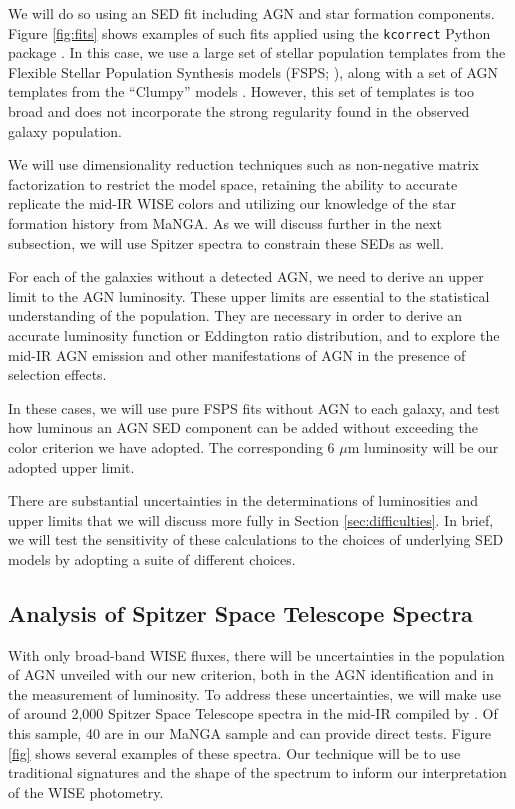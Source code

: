 \documentclass[12pt, preprint]{hacked-aastex}
\begin{document}
We will do so using an SED fit including AGN and star formation components. 
Figure \ref{fig:fits} shows examples of such fits applied using the
{\tt kcorrect} Python package \cite{blanton07a}. In this case, we use  
a large set of stellar population templates from the Flexible Stellar
Population Synthesis models (FSPS; \cite{conroy09a}), along with a set of AGN
templates from the ``Clumpy'' models \cite{nenkova08a}. However, this set
of templates is too broad and does not incorporate the strong regularity 
found in the observed galaxy population. 

We will use dimensionality reduction techniques such as non-negative 
matrix factorization to restrict the model space, retaining the ability
to accurate replicate the mid-IR WISE colors and utilizing our knowledge
of the star formation history from MaNGA.
As we will discuss further in the next subsection, we will use Spitzer spectra 
to constrain these SEDs as well.

For each of the galaxies without a detected AGN, we need to derive an
upper limit to the AGN luminosity. These upper limits are essential to 
the statistical understanding of the population. They are necessary in 
order to derive an accurate luminosity function or Eddington ratio
distribution, and to explore the mid-IR AGN emission and other manifestations 
of AGN in the presence of selection effects.

In these cases, we will use pure FSPS fits without AGN to each galaxy, and
test how luminous an AGN SED component can be added without exceeding the 
color criterion we have adopted. The corresponding 6 $\mu$m luminosity 
will be our adopted upper limit.

There are substantial uncertainties in the determinations of luminosities
and upper limits that we will discuss more fully in  Section 
\ref{sec:difficulties}. In brief, we will test the sensitivity 
of these calculations to the choices of underlying SED models by adopting 
a suite of different choices. 


\subsection{Analysis of Spitzer Space Telescope Spectra}
\label{sec:spitzer}

With only broad-band WISE fluxes, there will be uncertainties in 
the population of AGN unveiled with our new criterion, both in the 
AGN identification and in the measurement of luminosity. To address 
these uncertainties, we will make use of around 2,000 Spitzer Space Telescope
spectra in the mid-IR compiled by \cite{lambrides}. Of this sample, 40 
are in our MaNGA sample and can provide direct tests. 
Figure \ref{fig} shows several examples of these spectra.
Our technique will
be to use traditional signatures and the shape of the spectrum to 
inform our interpretation of the WISE photometry.
\end{document}
